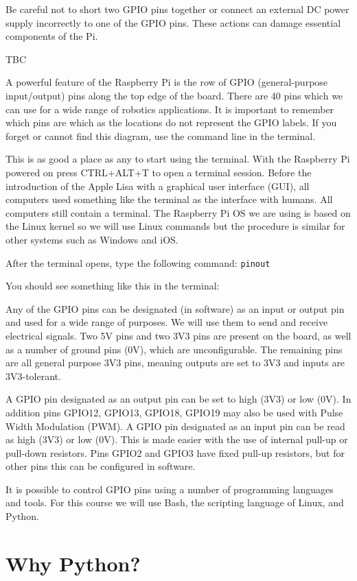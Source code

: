 \documentclass[
]{book}
\begin{document}
Be careful not to short two GPIO pins together or connect an external DC power supply incorrectly to one of the GPIO pins. These actions can damage essential components of the Pi.

TBC

A powerful feature of the Raspberry Pi is the row of GPIO (general-purpose input/output) pins along the top edge of the board. There are 40 pins which we can use for a wide range of robotics applications.
It is important to remember which pins are which as the locations do not represent the GPIO labels. If you forget or cannot find this diagram, use the command line in the terminal.

This is as good a place as any to start using the terminal. With the Raspberry Pi powered on press CTRL+ALT+T to open a terminal session. Before the introduction of the Apple Lisa with a graphical user interface (GUI), all computers used something like the terminal as the interface with humans. All computers still contain a terminal. The Raspberry Pi OS we are using is based on the Linux kernel so we will use Linux commands but the procedure is similar for other systems such as Windows and iOS.

After the terminal opens, type the following command: \texttt{pinout}

You should see something like this in the terminal:

Any of the GPIO pins can be designated (in software) as an input or output pin and used for a wide range of purposes. We will use them to send and receive electrical signals. Two 5V pins and two 3V3 pins are present on the board, as well as a number of ground pins (0V), which are unconfigurable. The remaining pins are all general purpose 3V3 pins, meaning outputs are set to 3V3 and inputs are 3V3-tolerant.

A GPIO pin designated as an output pin can be set to high (3V3) or low (0V). In addition pins GPIO12, GPIO13, GPIO18, GPIO19 may also be used with Pulse Width Modulation (PWM). A GPIO pin designated as an input pin can be read as high (3V3) or low (0V). This is made easier with the use of internal pull-up or pull-down resistors. Pins GPIO2 and GPIO3 have fixed pull-up resistors, but for other pins this can be configured in software.

It is possible to control GPIO pins using a number of programming languages and tools. For this course we will use Bash, the scripting language of Linux, and Python.

\hypertarget{why-python}{%
\section{Why Python?}\label{why-python}}
\end{document}
